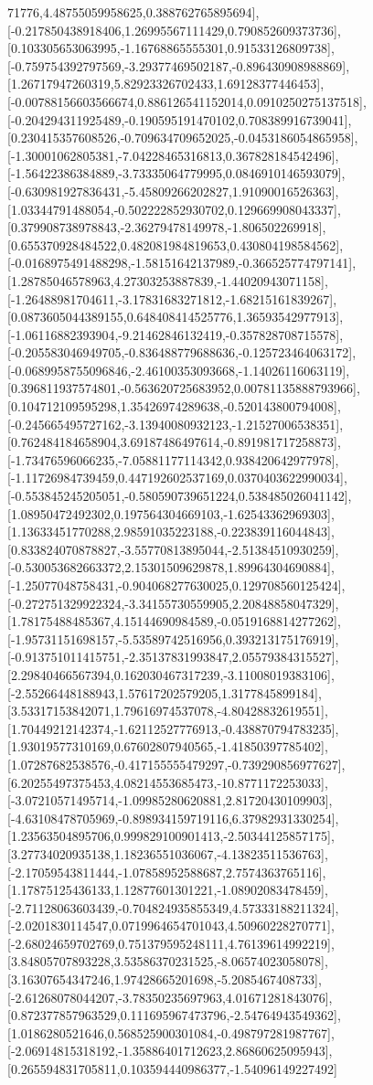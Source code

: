 \documentclass{article}
\begin{document}
71776,4.48755059958625,0.388762765895694],[-0.217850438918406,1.26995567111429,0.790852609373736],[0.103305653063995,-1.16768865555301,0.91533126809738],[-0.759754392797569,-3.29377469502187,-0.896430908988869],[1.26717947260319,5.82923326702433,1.69128377446453],[-0.00788156603566674,0.886126541152014,0.0910250275137518],[-0.204294311925489,-0.190595191470102,0.708389916739041],[0.230415357608526,-0.709634709652025,-0.0453186054865958],[-1.30001062805381,-7.04228465316813,0.367828184542496],[-1.56422386384889,-3.73335064779995,0.0846910146593079],[-0.630981927836431,-5.45809266202827,1.91090016526363],[1.03344791488054,-0.502222852930702,0.129669908043337],[0.379908738978843,-2.36279478149978,-1.806502269918],[0.655370928484522,0.482081984819653,0.430804198584562],[-0.0168975491488298,-1.58151642137989,-0.366525774797141],[1.28785046578963,4.27303253887839,-1.44020943071158],[-1.26488981704611,-3.17831683271812,-1.68215161839267],[0.0873605044389155,0.648408414525776,1.36593542977913],[-1.06116882393904,-9.21462846132419,-0.357828708715578],[-0.205583046949705,-0.836488779688636,-0.125723464063172],[-0.0689958755096846,-2.46100353093668,-1.14026116063119],[0.396811937574801,-0.563620725683952,0.00781135888793966],[0.104712109595298,1.35426974289638,-0.520143800794008],[-0.245665495727162,-3.13940080932123,-1.21527006538351],[0.762484184658904,3.69187486497614,-0.891981717258873],[-1.73476596066235,-7.05881177114342,0.938420642977978],[-1.11726984739459,0.447192602537169,0.0370403622990034],[-0.553845245205051,-0.580590739651224,0.538485026041142],[1.08950472492302,0.197564304669103,-1.62543362969303],[1.13633451770288,2.98591035223188,-0.223839116044843],[0.833824070878827,-3.55770813895044,-2.51384510930259],[-0.530053682663372,2.15301509629878,1.89964304690884],[-1.25077048758431,-0.904068277630025,0.129708560125424],[-0.272751329922324,-3.34155730559905,2.20848858047329],[1.78175488485367,4.15144690984589,-0.0519168814277262],[-1.95731151698157,-5.53589742516956,0.393213175176919],[-0.913751011415751,-2.35137831993847,2.05579384315527],[2.29840466567394,0.162030467317239,-3.11008019383106],[-2.55266448188943,1.57617202579205,1.3177845899184],[3.53317153842071,1.79616974537078,-4.80428832619551],[1.70449212142374,-1.62112527776913,-0.438870794783235],[1.93019577310169,0.67602807940565,-1.41850397785402],[1.07287682538576,-0.417155555479297,-0.739290856977627],[6.20255497375453,4.08214553685473,-10.8771172253033],[-3.07210571495714,-1.09985280620881,2.81720430109903],[-4.63108478705969,-0.898934159719116,6.37982931330254],[1.23563504895706,0.999829100901413,-2.50344125857175],[3.27734020935138,1.18236551036067,-4.13823511536763],[-2.17059543811444,-1.07858952588687,2.7574363765116],[1.17875125436133,1.12877601301221,-1.08902083478459],[-2.71128063603439,-0.704824935855349,4.57333188211324],[-2.0201830114547,0.0719964654701043,4.50960228270771],[-2.68024659702769,0.751379595248111,4.76139614992219],[3.84805707893228,3.53586370231525,-8.06574023058078],[3.16307654347246,1.97428665201698,-5.2085467408733],[-2.61268078044207,-3.78350235697963,4.01671281843076],[0.872377857963529,0.111695967473796,-2.54764943549362],[1.0186280521646,0.568525900301084,-0.498797281987767],[-2.06914815318192,-1.35886401712623,2.86860625095943],[0.265594831705811,0.103594440986377,-1.54096149227492]
\end{document}
